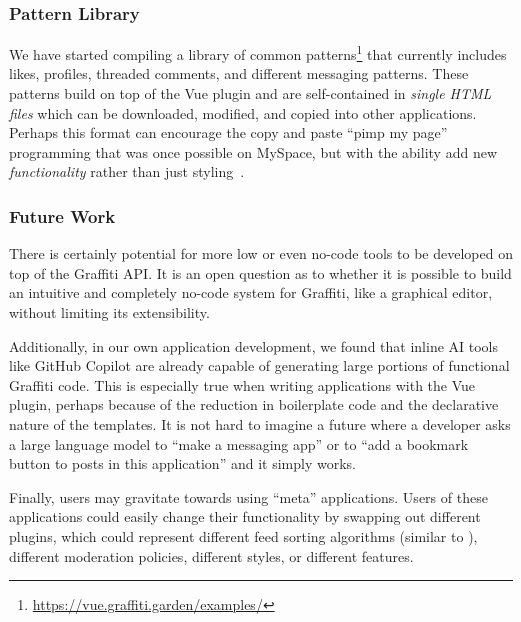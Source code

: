\subsubsection{Pattern Library}

We have started compiling a library of common patterns\footnote{
    \url{https://vue.graffiti.garden/examples/}
} that currently includes likes, profiles, threaded comments,
and different messaging patterns.
These patterns build on top of the Vue plugin
and are self-contained in \emph{single HTML files}
which can be downloaded, modified, and copied into other
applications.
Perhaps this format can encourage the copy and paste ``pimp my page''
programming that was once possible on MySpace, but with the ability
add new \emph{functionality} rather than just styling~\cite{copypasteliteracy}.

\subsubsection{Future Work}
\label{above-and-below:above:future-work}

There is certainly potential for more low or even no-code tools
to be developed on top of the Graffiti API. It is an open
question as to whether it is possible to build an intuitive and completely
no-code system for Graffiti, like a graphical editor, without limiting
its extensibility.

Additionally, in our own application development,
we found that inline AI tools like GitHub Copilot are already
capable of generating large portions of functional Graffiti code.
This is especially true when writing applications with the
Vue plugin, perhaps because of the reduction in boilerplate
code and the declarative nature of the templates.
It is not hard to imagine a future where a developer asks
a large language model to ``make a messaging app''
or to ``add a bookmark button to posts in this application'' and
it simply works.

Finally, users may gravitate towards using ``meta'' applications.
Users of these applications could easily change their functionality
by swapping out different plugins,
which could represent different feed sorting algorithms
(similar to \cite{threeleggedstool, bluesky}),
different moderation policies, different styles,
or different features.

